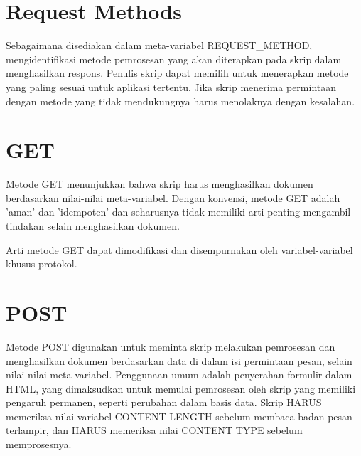 \documentclass{article}
\begin{document}
\section{Request Methods}
Sebagaimana disediakan dalam meta-variabel REQUEST_METHOD, mengidentifikasi metode pemrosesan yang akan diterapkan pada skrip dalam menghasilkan respons. Penulis skrip dapat memilih untuk menerapkan metode yang paling sesuai untuk aplikasi tertentu. Jika skrip menerima permintaan dengan metode yang tidak mendukungnya harus menolaknya dengan kesalahan.

\section{GET}
Metode GET menunjukkan bahwa skrip harus menghasilkan dokumen berdasarkan nilai-nilai meta-variabel. Dengan konvensi, metode GET adalah 'aman' dan 'idempoten' dan seharusnya tidak memiliki arti penting mengambil tindakan selain menghasilkan dokumen.

Arti metode GET dapat dimodifikasi dan disempurnakan oleh variabel-variabel khusus protokol.

\section{POST}
Metode POST digunakan untuk meminta skrip melakukan pemrosesan dan menghasilkan dokumen berdasarkan data di dalam isi permintaan pesan, selain nilai-nilai meta-variabel. Penggunaan umum adalah penyerahan formulir dalam HTML, yang dimaksudkan untuk memulai pemrosesan oleh skrip yang memiliki pengaruh permanen, seperti perubahan dalam basis data.
Skrip HARUS memeriksa nilai variabel CONTENT LENGTH sebelum membaca badan pesan terlampir, dan HARUS memeriksa nilai CONTENT TYPE sebelum memprosesnya.
\end{document}
